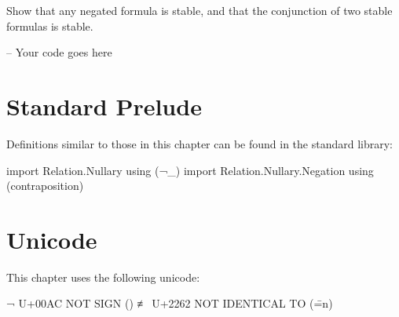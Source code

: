 Show that any negated formula is stable, and that the conjunction of two
stable formulas is stable.

\begin{fence}
\begin{code}
-- Your code goes here
\end{code}
\end{fence}

\hypertarget{standard-prelude}{%
\section{Standard Prelude}\label{standard-prelude}}

Definitions similar to those in this chapter can be found in the
standard library:

\begin{fence}
\begin{code}
import Relation.Nullary using (¬_)
import Relation.Nullary.Negation using (contraposition)
\end{code}
\end{fence}

\hypertarget{unicode}{%
\section{Unicode}\label{unicode}}

This chapter uses the following unicode:

\begin{myDisplay}
¬  U+00AC  NOT SIGN (\neg)
≢  U+2262  NOT IDENTICAL TO (\==n)
\end{myDisplay}

